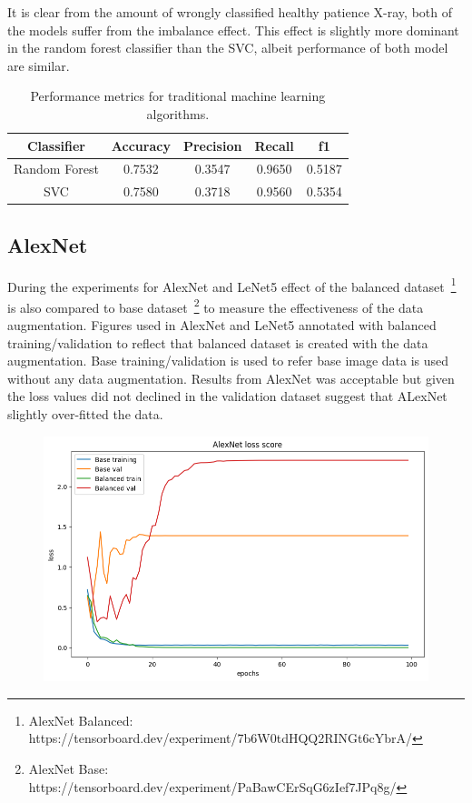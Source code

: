 It is clear from the amount of wrongly classified healthy patience X-ray, both of the models suffer from the imbalance effect.
This effect is slightly more dominant in the random forest classifier than the SVC, albeit performance of both model are similar.

\begin{table}[H]
    \centering
    \begin{tabular}{||c c c c c||} 
    \hline
    Classifier & Accuracy & Precision & Recall & f1\\ [0.5ex] 
    \hline\hline
    Random Forest & 0.7532 & 0.3547 & 0.9650 & 0.5187\\ 
    \hline
    SVC & 0.7580 & 0.3718 & 0.9560 & 0.5354\\
    \hline
    \end{tabular}
    \caption{Performance metrics for traditional machine learning algorithms.}
    \label{table:mlmetrics}
\end{table}



\subsection{AlexNet}
During the experiments for AlexNet and LeNet5 effect of the balanced dataset~\footnote{AlexNet Balanced: https://tensorboard.dev/experiment/7b6W0tdHQQ2RINGt6cYbrA/} is also compared to base dataset~\footnote{AlexNet Base: https://tensorboard.dev/experiment/PaBawCErSqG6zIef7JPq8g/} to measure the effectiveness of the data augmentation.
Figures used in AlexNet and LeNet5 annotated with balanced training/validation to reflect that balanced dataset is created with the data augmentation.
Base training/validation is used to refer base image data is used without any data augmentation.
Results from AlexNet was acceptable but given the loss values did not declined in the validation dataset suggest that ALexNet slightly over-fitted the data.

\begin{figure}[H]
    \centering
    \includegraphics[width=.9\textwidth]{img/alexnetloss.png}
    \caption{}
    \label{fig:alexloss}
\end{figure}

